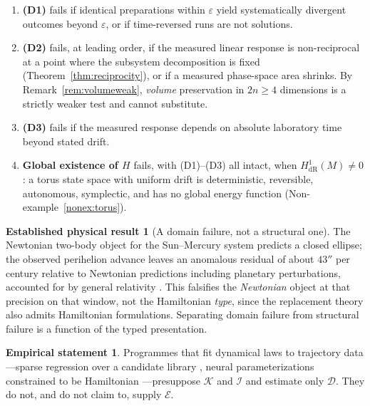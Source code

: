 \documentclass[10pt,a4paper]{article}
\theoremstyle{plain}
\theoremstyle{definition}
\newtheorem{empirical}[theorem]{Empirical statement}
\newtheorem{established}[theorem]{Established physical result}
\newcommand{\dR}{\mathrm{dR}}
\begin{document}
\begin{enumerate}[leftmargin=*,itemsep=0pt]
\item \textbf{(D1)} fails if identical preparations within $\varepsilon$ yield systematically divergent outcomes beyond $\varepsilon$, or if time-reversed runs are not solutions.
\item \textbf{(D2)} fails, at leading order, if the measured linear response is non-reciprocal at a point where the subsystem decomposition is fixed (Theorem~\ref{thm:reciprocity}), or if a measured phase-space area shrinks. By Remark~\ref{rem:volumeweak}, \emph{volume} preservation in $2n\geq4$ dimensions is a strictly weaker test and cannot substitute.
\item \textbf{(D3)} fails if the measured response depends on absolute laboratory time beyond stated drift.
\item \textbf{Global existence of $H$} fails, with (D1)--(D3) all intact, when $H^1_{\dR}(M)\neq0$: a torus state space with uniform drift is deterministic, reversible, autonomous, symplectic, and has no global energy function (Non-example~\ref{nonex:torus}).
\end{enumerate}

\begin{established}[A domain failure, not a structural one]
\label{est:mercury}
The Newtonian two-body object for the Sun--Mercury system predicts a closed ellipse; the observed perihelion advance leaves an anomalous residual of about $43''$ per century relative to Newtonian predictions including planetary perturbations, accounted for by general relativity \cite{Will2014}. This falsifies the \emph{Newtonian} object at that precision on that window, not the Hamiltonian \emph{type}, since the replacement theory also admits Hamiltonian formulations. Separating domain failure from structural failure is a function of the typed presentation.
\end{established}

\begin{empirical}
\label{emp:datadriven}
Programmes that fit dynamical laws to trajectory data---sparse regression over a candidate library \cite{BruntonProctorKutz2016}, neural parameterizations constrained to be Hamiltonian \cite{Greydanus2019}---presuppose $\mathcal{K}$ and $\mathcal{I}$ and estimate only $\mathcal{D}$. They do not, and do not claim to, supply $\mathcal{E}$.
\end{empirical}
\end{document}
